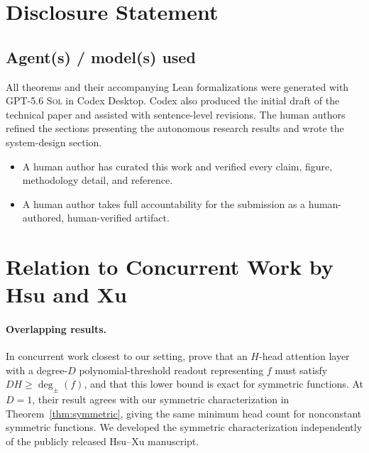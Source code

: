 \documentclass{article}
\theoremstyle{definition}
\theoremstyle{plain}
\newcommand{\tdeg}{\deg_{\pm}}
\newcommand{\gpt}{\textsc{GPT-5.6 Sol}\xspace}
\begin{document}
\section{Disclosure Statement}

\subsection*{Agent(s) / model(s) used}

All theorems and their accompanying Lean formalizations were generated with \gpt{} in Codex Desktop. Codex also produced the initial draft of the technical paper and assisted with sentence-level revisions. The human authors refined the sections presenting the autonomous research results and wrote the system-design section.

\begin{itemize}[leftmargin=1.8em,nosep]
  \item[$\boxed{\checkmark}$] A human author has curated this work and verified every claim, figure, methodology detail, and reference.
  \item[$\boxed{\checkmark}$]  A human author takes full accountability for the submission as a human-authored, human-verified artifact.
\end{itemize}

\clearpage
\renewcommand{\bibsection}{\section{References}}



\clearpage
\section{Relation to Concurrent Work by Hsu and Xu}
\label{app:hsu-comparison}

\paragraph{Overlapping results.}
In concurrent work closest to our setting, \citet{hsu2026attentionbased} prove that an $H$-head attention layer with a degree-$D$ polynomial-threshold readout representing $f$ must satisfy $DH\geq\tdeg(f)$, and that this lower bound is exact for symmetric functions. At $D=1$, their result agrees with our symmetric characterization in Theorem~\ref{thm:symmetric}, giving the same minimum head count for nonconstant symmetric functions. We developed the symmetric characterization independently of the publicly released Hsu--Xu manuscript.
\end{document}
